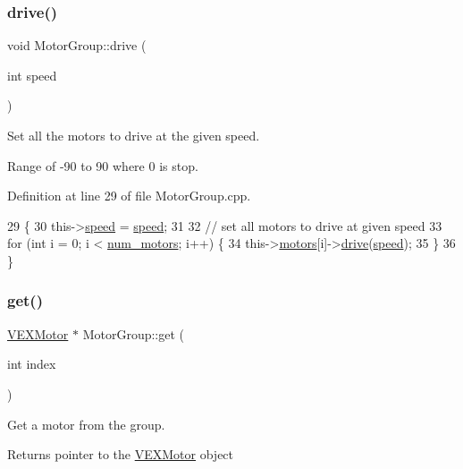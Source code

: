\subsubsection{\texorpdfstring{drive()}{drive()}}
{\footnotesize\ttfamily void Motor\+Group\+::drive (\begin{DoxyParamCaption}\item[{int}]{speed }\end{DoxyParamCaption})}



Set all the motors to drive at the given speed. 

Range of -\/90 to 90 where 0 is stop. 

Definition at line 29 of file Motor\+Group.\+cpp.


\begin{DoxyCode}
29                                 \{
30     this->\hyperlink{class_motor_group_a79ddfc90443f2f919d88f66e51494d97}{speed} = \hyperlink{class_motor_group_a79ddfc90443f2f919d88f66e51494d97}{speed};
31 
32     \textcolor{comment}{// set all motors to drive at given speed}
33     \textcolor{keywordflow}{for} (\textcolor{keywordtype}{int} i = 0; i < \hyperlink{class_motor_group_a93ffa3ad9fc210e6d2ed29b50dbf7292}{num\_motors}; i++) \{
34         this->\hyperlink{class_motor_group_a8f2d6b4622a775ee0c5e95aafb83a1bb}{motors}[i]->\hyperlink{class_v_e_x_motor_ac8ab5c30e4be4a9e3ed290e7827bcf1a}{drive}(\hyperlink{class_motor_group_a79ddfc90443f2f919d88f66e51494d97}{speed});
35     \}
36 \}
\end{DoxyCode}
\mbox{\label{class_motor_group_a5bb7e87231ada3770df40783a2c6afda}} 
\subsubsection{\texorpdfstring{get()}{get()}}
{\footnotesize\ttfamily \hyperlink{class_v_e_x_motor}{V\+E\+X\+Motor} $\ast$ Motor\+Group\+::get (\begin{DoxyParamCaption}\item[{int}]{index }\end{DoxyParamCaption})}



Get a motor from the group. 

\begin{DoxyReturn}{Returns}
pointer to the \hyperlink{class_v_e_x_motor}{V\+E\+X\+Motor} object 
\end{DoxyReturn}


